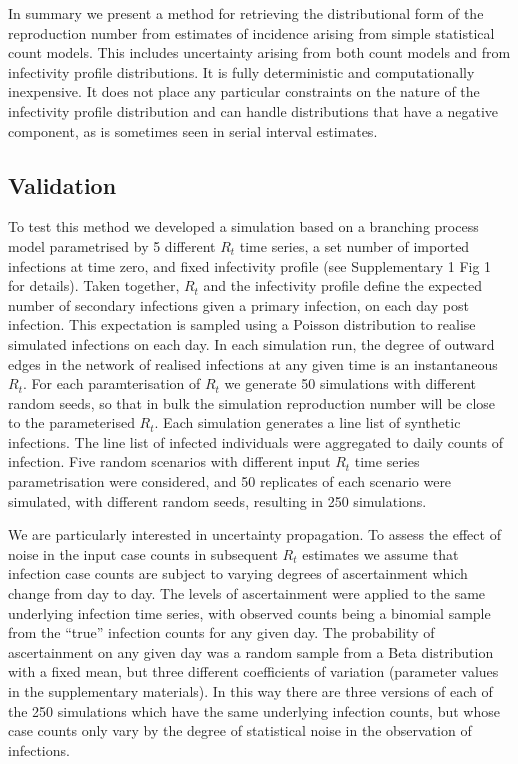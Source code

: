 \documentclass[10pt,letterpaper]{article}
\begin{document}
In summary we present a method for retrieving the distributional form of the reproduction number from estimates of incidence arising from simple statistical count models. This includes uncertainty arising from both count models and from infectivity profile distributions. It is fully deterministic and computationally inexpensive. It does not place any particular constraints on the nature of the infectivity profile distribution and can handle distributions that have a negative component, as is sometimes seen in serial interval estimates.

\subsection*{Validation}

To test this method we developed a simulation based on a branching process model parametrised by 5 different $R_t$ time series, a set number of imported infections at time zero, and fixed infectivity profile (see Supplementary 1 Fig 1 for details). Taken together, $R_t$ and the infectivity profile define the expected number of secondary infections given a primary infection, on each day post infection. This expectation is sampled using a Poisson distribution to realise simulated infections on each day. In each simulation run, the degree of outward edges in the network of realised infections at any given time is an instantaneous $R_t$. For each paramterisation of $R_t$ we generate 50 simulations with different random seeds, so that in bulk the simulation reproduction number will be close to the parameterised $R_t$. Each simulation generates a line list of synthetic infections. The line list of infected individuals were aggregated to daily counts of infection. Five random scenarios with different input $R_t$ time series parametrisation were considered, and 50 replicates of each scenario were simulated, with different random seeds, resulting in 250 simulations.

We are particularly interested in uncertainty propagation. To assess the effect of noise in the input case counts in subsequent $R_t$ estimates we assume that infection case counts are subject to varying degrees of ascertainment which change from day to day. The levels of ascertainment were applied to the same underlying infection time series, with observed counts being a binomial sample from the ``true'' infection counts for any given day. The probability of ascertainment on any given day was a random sample from a Beta distribution with a fixed mean, but three different coefficients of variation (parameter values in the supplementary materials). In this way there are three versions of each of the 250 simulations which have the same underlying infection counts, but whose case counts only vary by the degree of statistical noise in the observation of infections.
\end{document}
